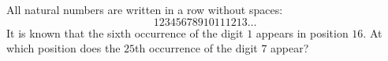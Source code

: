 All natural numbers are written in a row without spaces: \[12345678910111213\ldots\]It is known that the sixth occurrence of the digit $1$ appears in position $16$. At which position does the $25$th occurrence of the digit $7$ appear?

